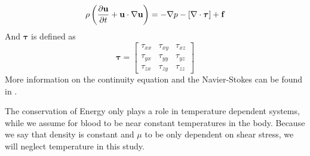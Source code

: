 \begin{equation}
\label{incNVST}
\rho\left(\frac{\partial{\bf u}}{\partial t} + {\bf u} \cdot \nabla{\bf u}\right) = -\nabla p - \left[\nabla \cdot{\bm \tau}\right] + {\bf f}
\end{equation} 
And $\bm \tau$ is defined as
\begin{equation}
\bm \tau = \begin{bmatrix}
			\tau_{xx} & \tau_{xy} & \tau_{xz} \\
			\tau_{yx} & \tau_{yy} & \tau_{yz} \\
			\tau_{zx} & \tau_{zy} & \tau_{zz} 
			\end{bmatrix}
\end{equation}
More information on the continuity equation and the Navier-Stokes can be found in \cite{TP}.

The conservation of Energy only plays a role in temperature dependent systems, while we assume for blood to be near constant temperatures in the body. Because we say that density is constant and $\mu$ to be only dependent on shear stress, we will neglect temperature in this study. 
